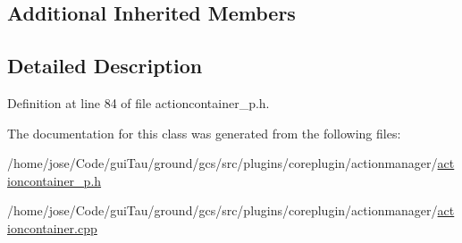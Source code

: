 \subsection*{Additional Inherited Members}


\subsection{Detailed Description}


Definition at line 84 of file actioncontainer\-\_\-p.\-h.



The documentation for this class was generated from the following files\-:\begin{DoxyCompactItemize}
\item 
/home/jose/\-Code/gui\-Tau/ground/gcs/src/plugins/coreplugin/actionmanager/\hyperlink{actioncontainer__p_8h}{actioncontainer\-\_\-p.\-h}\item 
/home/jose/\-Code/gui\-Tau/ground/gcs/src/plugins/coreplugin/actionmanager/\hyperlink{actioncontainer_8cpp}{actioncontainer.\-cpp}\end{DoxyCompactItemize}
